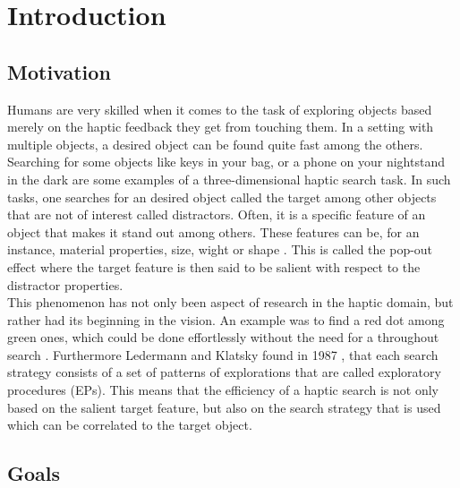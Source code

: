
\chapter{Introduction} %

\label{Introduction} %


\newcommand{\keyword}[1]{\textbf{#1}}
\newcommand{\tabhead}[1]{\textbf{#1}}
\newcommand{\code}[1]{\texttt{#1}}
\newcommand{\file}[1]{\texttt{\bfseries#1}}
\newcommand{\option}[1]{\texttt{\itshape#1}}

\section{Motivation}
Humans are very skilled when it comes to the task of exploring objects based merely on the haptic feedback they get from touching them. In a setting with multiple objects, a desired object can be found quite fast among the others. Searching for some objects like keys in your bag, or a phone on your nightstand in the dark are some examples of a three-dimensional haptic search task. In such tasks, one searches for an desired object called the target among other objects that are not of interest called distractors. Often, it is a specific feature of an object that makes it stand out among others. These features can be, for an instance, material properties, size, wight or shape \cite{HapticShape}. This is called the pop-out effect where the target feature is then said to be salient with respect to the distractor properties. \\
This phenomenon has not only been aspect of research in the haptic domain, but rather had its beginning in the vision. An example was to find a red dot among green ones, which could be done effortlessly without the need for a throughout search \cite{treisman_gormican_1988}. Furthermore Ledermann and Klatsky found in 1987 \cite{EPs}, that each search strategy consists of a set of patterns of explorations that are called exploratory procedures (EPs). This means that the efficiency of a haptic search is not only based on the salient target feature, but also on the search strategy that is used which can be correlated to the target object.
\section{Goals} \label{Goals}